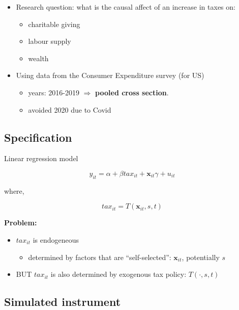 \documentclass[
  letterpaper,
  DIV=11,
  numbers=noendperiod]{scrartcl}
\providecommand{\tightlist}{%
  \setlength{\itemsep}{0pt}\setlength{\parskip}{0pt}}
\begin{document}
\begin{itemize}
\item
  Research question: what is the causal affect of an increase in taxes
  on:

  \begin{itemize}
  \tightlist
  \item
    charitable giving
  \item
    labour supply
  \item
    wealth
  \end{itemize}
\item
  Using data from the Consumer Expenditure survey (for US)

  \begin{itemize}
  \item
    years: 2016-2019 \(\Rightarrow\) \textbf{pooled cross section}.
  \item
    avoided 2020 due to Covid
  \end{itemize}
\end{itemize}

\subsection{Specification}\label{specification}

Linear regression model

\[
  y_{it} = \alpha + \beta tax_{it} + \mathbf{x}_{it}\gamma + u_{it}
\]

where,

\[
  tax_{it} = T(\mathbf{x}_{it},s,t)
\]

\textbf{Problem:}

\begin{itemize}
\item
  \(tax_{it}\) is endogeneous

  \begin{itemize}
  \tightlist
  \item
    determined by factors that are ``self-selected'':
    \(\mathbf{x}_{it}\), potentially \(s\)
  \end{itemize}
\item
  BUT \(tax_{it}\) is also determined by exogenous tax policy:
  \(T(\cdot,s,t)\)
\end{itemize}

\subsection{Simulated instrument}\label{simulated-instrument}
\end{document}
